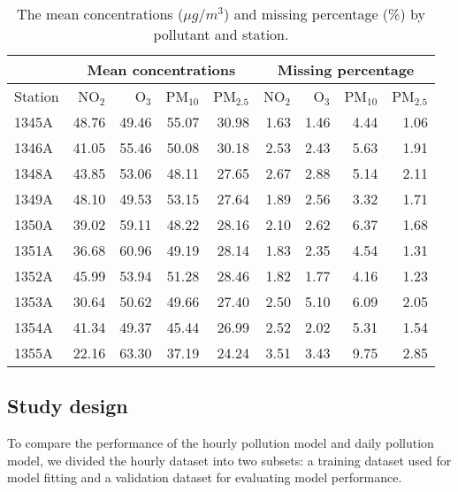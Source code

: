 \documentclass[
  12,
]{article}
\begin{document}
\begin{table}[h]

\caption{\label{tab:datasummary2}The mean concentrations ($\mu g/m^{3}$) and missing percentage (\%) by pollutant and station.}
\centering
\begin{tabular}[t]{lrrrrrrrr}\hline
\multicolumn{1}{c}{\textbf{ }} & \multicolumn{4}{c}{\textbf{Mean concentrations}} & \multicolumn{4}{c}{\textbf{Missing percentage}} \\\hline
Station & NO$_2$ & O$_3$ & PM$_{10}$ & PM$_{2.5}$ & NO$_2$ & O$_3$ & PM$_{10}$ & PM$_{2.5}$\\\hline
1345A & 48.76 & 49.46 & 55.07 & 30.98 & 1.63 & 1.46 & 4.44 & 1.06\\
1346A & 41.05 & 55.46 & 50.08 & 30.18 & 2.53 & 2.43 & 5.63 & 1.91\\
1348A & 43.85 & 53.06 & 48.11 & 27.65 & 2.67 & 2.88 & 5.14 & 2.11\\
1349A & 48.10 & 49.53 & 53.15 & 27.64 & 1.89 & 2.56 & 3.32 & 1.71\\
1350A & 39.02 & 59.11 & 48.22 & 28.16 & 2.10 & 2.62 & 6.37 & 1.68\\
1351A & 36.68 & 60.96 & 49.19 & 28.14 & 1.83 & 2.35 & 4.54 & 1.31\\
1352A & 45.99 & 53.94 & 51.28 & 28.46 & 1.82 & 1.77 & 4.16 & 1.23\\
1353A & 30.64 & 50.62 & 49.66 & 27.40 & 2.50 & 5.10 & 6.09 & 2.05\\
1354A & 41.34 & 49.37 & 45.44 & 26.99 & 2.52 & 2.02 & 5.31 & 1.54\\
1355A & 22.16 & 63.30 & 37.19 & 24.24 & 3.51 & 3.43 & 9.75 & 2.85\\\hline
\end{tabular}
\end{table}

\hypertarget{study-design}{%
\subsection{Study design}\label{study-design}}

To compare the performance of the hourly pollution model and daily
pollution model, we divided the hourly dataset into two subsets: a
training dataset used for model fitting and a validation dataset for
evaluating model performance.
\end{document}
